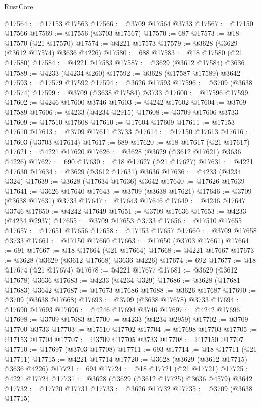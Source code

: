 \begin{lexlean}{RustCore}
\begin{coremodule}
@17564 := @17153 @17563
@17566 := @3709 @17564 @3733
@17567 := @17150 @17566
@17569 := @17556 (@3703 @17567)
@17570 := 687
@17573 := @18 @17570 (@21 @17570)
@17574 := @4221 @17573
@17579 := @3628 (@3629 (@3612 @17574) @3636 @4226)
@17580 := 688
@17583 := @18 @17580 (@21 @17580)
@17584 := @4221 @17583
@17587 := @3629 (@3612 @17584) @3636
@17589 := @4233 (@4234 @260)
@17592 := @3628 (@17587 @17589) @3642
@17593 := @17579 @17592
@17594 := @3626 @17593
@17596 := @3709 (@3638 @17574)
@17599 := @3709 (@3638 @17584) @3733
@17600 := @17596 @17599
@17602 := @4246 @17600 @3746
@17603 := @4242 @17602
@17604 := @3709 @17589
@17606 := @4233 (@4234 @2915)
@17608 := @3709 @17606 @3733
@17609 := @17510 @17608
@17610 := @17604 @17609
@17611 := @17153 @17610
@17613 := @3709 @17611 @3733
@17614 := @17150 @17613
@17616 := @17603 (@3703 @17614)
@17617 := 689
@17620 := @18 @17617 (@21 @17617)
@17621 := @4221 @17620
@17626 := @3628 (@3629 (@3612 @17621) @3636 @4226)
@17627 := 690
@17630 := @18 @17627 (@21 @17627)
@17631 := @4221 @17630
@17634 := @3629 (@3612 @17631) @3636
@17636 := @4233 (@4234 @324)
@17639 := @3628 (@17634 @17636) @3642
@17640 := @17626 @17639
@17641 := @3626 @17640
@17643 := @3709 (@3638 @17621)
@17646 := @3709 (@3638 @17631) @3733
@17647 := @17643 @17646
@17649 := @4246 @17647 @3746
@17650 := @4242 @17649
@17651 := @3709 @17636
@17653 := @4233 (@4234 @2937)
@17655 := @3709 @17653 @3733
@17656 := @17510 @17655
@17657 := @17651 @17656
@17658 := @17153 @17657
@17660 := @3709 @17658 @3733
@17661 := @17150 @17660
@17663 := @17650 (@3703 @17661)
@17664 := 691
@17667 := @18 @17664 (@21 @17664)
@17668 := @4221 @17667
@17673 := @3628 (@3629 (@3612 @17668) @3636 @4226)
@17674 := 692
@17677 := @18 @17674 (@21 @17674)
@17678 := @4221 @17677
@17681 := @3629 (@3612 @17678) @3636
@17683 := @4233 (@4234 @329)
@17686 := @3628 (@17681 @17683) @3642
@17687 := @17673 @17686
@17688 := @3626 @17687
@17690 := @3709 (@3638 @17668)
@17693 := @3709 (@3638 @17678) @3733
@17694 := @17690 @17693
@17696 := @4246 @17694 @3746
@17697 := @4242 @17696
@17698 := @3709 @17683
@17700 := @4233 (@4234 @2959)
@17702 := @3709 @17700 @3733
@17703 := @17510 @17702
@17704 := @17698 @17703
@17705 := @17153 @17704
@17707 := @3709 @17705 @3733
@17708 := @17150 @17707
@17710 := @17697 (@3703 @17708)
@17711 := 693
@17714 := @18 @17711 (@21 @17711)
@17715 := @4221 @17714
@17720 := @3628 (@3629 (@3612 @17715) @3636 @4226)
@17721 := 694
@17724 := @18 @17721 (@21 @17721)
@17725 := @4221 @17724
@17731 := @3628 (@3629 (@3612 @17725) @3636 @4579) @3642
@17732 := @17720 @17731
@17733 := @3626 @17732
@17735 := @3709 (@3638 @17715)

\end{coremodule}
\end{lexlean}
